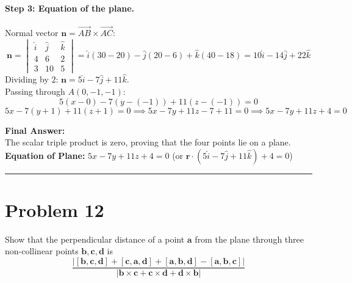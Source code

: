 \documentclass[11pt,a4paper]{article}
\begin{document}
\paragraph{Step 3: Equation of the plane.}
Normal vector $\mathbf{n} = \vec{AB} \times \vec{AC}$:
$$\mathbf{n} = \begin{vmatrix} \hat{i} & \hat{j} & \hat{k} \\ 4 & 6 & 2 \\ 3 & 10 & 5 \end{vmatrix} = \hat{i}(30 - 20) - \hat{j}(20 - 6) + \hat{k}(40 - 18) = 10\hat{i} - 14\hat{j} + 22\hat{k}$$
Dividing by $2$: $\mathbf{n} = 5\hat{i} - 7\hat{j} + 11\hat{k}$.\\
Passing through $A(0, -1, -1)$:
$$5(x - 0) - 7(y - (-1)) + 11(z - (-1)) = 0$$
$$5x - 7(y + 1) + 11(z + 1) = 0 \implies 5x - 7y + 11z - 7 + 11 = 0 \implies 5x - 7y + 11z + 4 = 0$$

\begin{resultbox}
\textbf{Final Answer:}\\
The scalar triple product is zero, proving that the four points lie on a plane.\\
\textbf{Equation of Plane:} $\boxed{5x - 7y + 11z + 4 = 0}$ \quad (or $\mathbf{r}\cdot(5\hat{i} - 7\hat{j} + 11\hat{k}) + 4 = 0$)
\end{resultbox}

\vspace{0.4cm}
\hrule
\vspace{0.4cm}

\section{Problem 12}
\begin{problembox}[Problem 12]
Show that the perpendicular distance of a point $\mathbf{a}$ from the plane through three non-collinear points $\mathbf{b}, \mathbf{c}, \mathbf{d}$ is
$$\frac{|[\mathbf{b}, \mathbf{c}, \mathbf{d}] + [\mathbf{c}, \mathbf{a}, \mathbf{d}] + [\mathbf{a}, \mathbf{b}, \mathbf{d}] - [\mathbf{a}, \mathbf{b}, \mathbf{c}]|}{|\mathbf{b}\times\mathbf{c} + \mathbf{c}\times\mathbf{d} + \mathbf{d}\times\mathbf{b}|}$$
\end{problembox}
\end{document}
